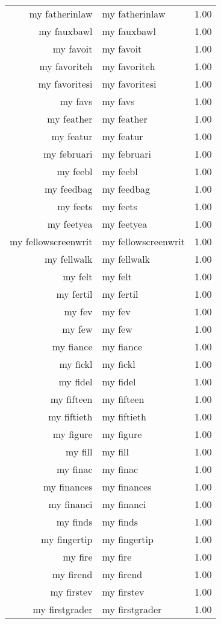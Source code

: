 \begin{table}[ht]
\begin{tabular}{rlr}
  my fatherinlaw & my fatherinlaw & 1.00 \\ 
  my fauxbawl & my fauxbawl & 1.00 \\ 
  my favoit & my favoit & 1.00 \\ 
  my favoriteh & my favoriteh & 1.00 \\ 
  my favoritesi & my favoritesi & 1.00 \\ 
  my favs & my favs & 1.00 \\ 
  my feather & my feather & 1.00 \\ 
  my featur & my featur & 1.00 \\ 
  my februari & my februari & 1.00 \\ 
  my feebl & my feebl & 1.00 \\ 
  my feedbag & my feedbag & 1.00 \\ 
  my feets & my feets & 1.00 \\ 
  my feetyea & my feetyea & 1.00 \\ 
  my fellowscreenwrit & my fellowscreenwrit & 1.00 \\ 
  my fellwalk & my fellwalk & 1.00 \\ 
  my felt & my felt & 1.00 \\ 
  my fertil & my fertil & 1.00 \\ 
  my fev & my fev & 1.00 \\ 
  my few & my few & 1.00 \\ 
  my fiance & my fiance & 1.00 \\ 
  my fickl & my fickl & 1.00 \\ 
  my fidel & my fidel & 1.00 \\ 
  my fifteen & my fifteen & 1.00 \\ 
  my fiftieth & my fiftieth & 1.00 \\ 
  my figure & my figure & 1.00 \\ 
  my fill & my fill & 1.00 \\ 
  my finac & my finac & 1.00 \\ 
  my finances & my finances & 1.00 \\ 
  my financi & my financi & 1.00 \\ 
  my finds & my finds & 1.00 \\ 
  my fingertip & my fingertip & 1.00 \\ 
  my fire & my fire & 1.00 \\ 
  my firend & my firend & 1.00 \\ 
  my firstev & my firstev & 1.00 \\ 
  my firstgrader & my firstgrader & 1.00 \\ 

\end{tabular}
\end{table}
